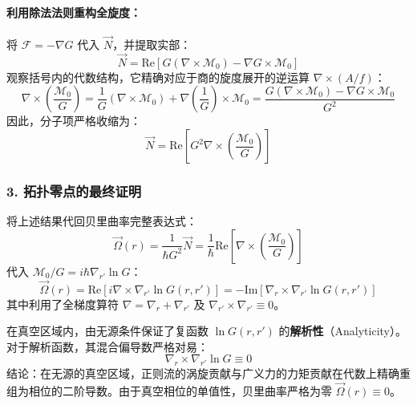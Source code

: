 \documentclass[a4paper,12pt]{article}
\begin{document}
\paragraph{利用除法法则重构全旋度：}
将 $\mathcal{F} = -\nabla G$ 代入 $\vec{N}$，并提取实部：
\begin{equation}
    \vec{N} = \text{Re} \left[ G (\nabla \times \mathcal{M}_0) - \nabla G \times \mathcal{M}_0 \right]
\end{equation}
观察括号内的代数结构，它精确对应于商的旋度展开的逆运算 $\nabla \times (A/f)$：
\begin{equation}
    \nabla \times \left( \frac{\mathcal{M}_0}{G} \right) = \frac{1}{G} (\nabla \times \mathcal{M}_0) + \nabla \left( \frac{1}{G} \right) \times \mathcal{M}_0 = \frac{G (\nabla \times \mathcal{M}_0) - \nabla G \times \mathcal{M}_0}{G^2}
\end{equation}
因此，分子项严格收缩为：
\begin{equation}
    \vec{N} = \text{Re} \left[ G^2 \nabla \times \left( \frac{\mathcal{M}_0}{G} \right) \right]
\end{equation}

\subsubsection{3. 拓扑零点的最终证明}

将上述结果代回贝里曲率完整表达式：
\begin{equation}
    \vec{\Omega}(r) = \frac{1}{\hbar G^2} \vec{N} = \frac{1}{\hbar} \text{Re} \left[ \nabla \times \left( \frac{\mathcal{M}_0}{G} \right) \right]
\end{equation}
代入 $\mathcal{M}_0/G = i\hbar \nabla_{r'} \ln G$：
\begin{equation}
    \vec{\Omega}(r) = \text{Re} \left[ i \nabla \times \nabla_{r'} \ln G(r,r') \right] = -\text{Im} \left[ \nabla_r \times \nabla_{r'} \ln G(r,r') \right]
\end{equation}
其中利用了全梯度算符 $\nabla = \nabla_r + \nabla_{r'}$ 及 $\nabla_{r'} \times \nabla_{r'} \equiv 0$。

在真空区域内，由无源条件保证了复函数 $\ln G(r,r')$ 的\textbf{解析性}（Analyticity）。对于解析函数，其混合偏导数严格对易：
\begin{equation}
    \nabla_r \times \nabla_{r'} \ln G \equiv 0
\end{equation}
结论：在无源的真空区域，正则流的涡旋贡献与广义力的力矩贡献在代数上精确重组为相位的二阶导数。由于真空相位的单值性，贝里曲率严格为零 $\vec{\Omega}(r) \equiv 0$。
\end{document}
